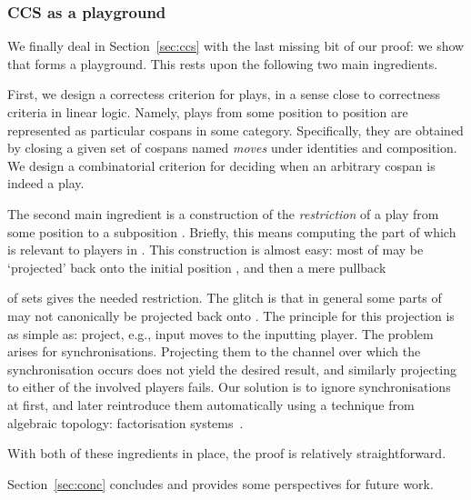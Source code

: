 \documentclass{LMCS}
\theoremstyle{plain}\newtheorem{satz}[thm]{Satz}
\begin{document}
\subsubsection{CCS as a playground}
We finally deal in Section~\ref{sec:ccs} with the last missing bit of
our proof: we show that  forms a playground. This rests upon
the following two main ingredients.

First, we design a correctess criterion for plays, in a sense close to
correctness criteria in linear logic.  Namely, plays from some
position  to position  are represented as particular cospans  in some category.  Specifically, they are
obtained by closing a given set of cospans named \emph{moves} under
identities and composition.  We design a combinatorial criterion
for deciding when an arbitrary cospan is indeed a play.

The second main ingredient is a construction of the \emph{restriction}
of a play  from some position  to a subposition .
Briefly, this means computing the part of  which is relevant to
players in . This construction is almost easy: most of  may be
`projected' back onto the initial position , and then a mere
pullback
\begin{center}
\end{center}
of sets gives the needed restriction. The glitch is that in general
some parts of  may not canonically be projected back onto . The
principle for this projection is as simple as: project, e.g., input
moves to the inputting player. The problem arises for
synchronisations. Projecting them to the channel over which the
synchronisation occurs does not yield the desired result, and
similarly projecting to either of the involved players fails.  Our
solution is to ignore synchronisations at first, and later reintroduce
them automatically using a technique from algebraic
topology: factorisation systems~\cite{Joyal:ncatlab:facto}.

With both of these ingredients in place, the proof is relatively
straightforward.

Section~\ref{sec:conc} concludes and provides some perspectives for
future work.
\end{document}
